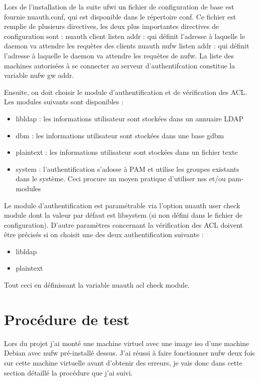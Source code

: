\documentclass[12pt]{report}
\begin{document}
\begin{itemize}
Lors de l'installation de la suite ufwi un fichier de configuration de base est fournie nuauth.conf, qui est disponible 
dans le répertoire conf.
Ce fichier est remplie de plusieurs directives, les deux plus importantes directives de configuration sont : 
nuauth client listen addr : qui définit l’adresse à laquelle le daemon va attendre les requètes des clients 
nuauth nufw listen addr : qui définit l’adresse à laquelle le daemon va attendre les requètes de nufw. 
La liste des machines autorisées à se connecter au serveur d'authentifcation constitue la variable nufw gw addr.

Ensuite, on doit choisir le module d’authentification et de vérification des ACL. Les modules suivants sont disponibles :
\begin{itemize}
 \item libldap : les informations utilisateur sont stockées dans un annuaire LDAP
 \item dbm : les informations utilisateur sont stockées dans une base gdbm
 \item plaintext : les informations utilisateur sont stockées dans un fichier texte
 \item system : l’authentification s’adosse à PAM et utilise les groupes existants dans le système. Ceci procure un 
moyen pratique d’utiliser nss et/ou pam-modules
\end{itemize}

Le module d’authentification est paramétrable via l’option nuauth user check module dont la valeur par défaut est
libsystem (si non défini dans le fichier de configuration). D’autre paramètres concernant la vérification
des ACL doivent être précisés si on choisit une des deux authentification suivante :
\begin{itemize}
 \item libldap
 \item plaintext
\end{itemize}
Tout ceci en définissant la variable nuauth acl check module.

 \section{Procédure de test}
Lors du projet j'ai monté une machine virtuel avec une image iso d'une machine Debian avec
nufw pré-installé dessus. J'ai réussi à faire fonctionner nufw deux fois sur cette machine
virtuelle avant d'obtenir des erreurs, je vais donc dans cette section détaillé la procédure 
que j'ai suivi.


\end{itemize}
\end{document}
